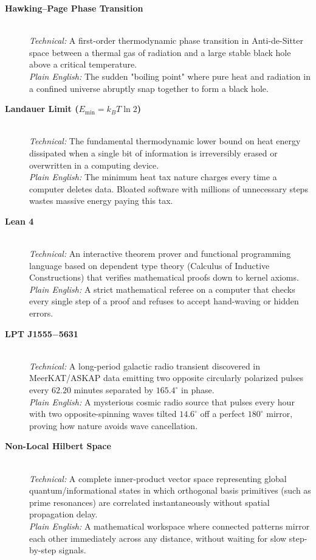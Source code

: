 \documentclass[11pt,a4paper,oneside]{article}
\def\texttt#1{#1}%
\theoremstyle{definition}
\begin{document}
\begin{description}
    \item[\textbf{Hawking–Page Phase Transition}] \hfill \\
    \textit{Technical:} A first-order thermodynamic phase transition in Anti-de-Sitter space between a thermal gas of radiation and a large stable black hole above a critical temperature. \\
    \textit{Plain English:} The sudden "boiling point" where pure heat and radiation in a confined universe abruptly snap together to form a black hole.

    \item[\textbf{Landauer Limit ($E_{\min} = k_B T \ln 2$)}] \hfill \\
    \textit{Technical:} The fundamental thermodynamic lower bound on heat energy dissipated when a single bit of information is irreversibly erased or overwritten in a computing device. \\
    \textit{Plain English:} The minimum heat tax nature charges every time a computer deletes data. Bloated software with millions of unnecessary steps wastes massive energy paying this tax.

    \item[\textbf{Lean 4}] \hfill \\
    \textit{Technical:} An interactive theorem prover and functional programming language based on dependent type theory (Calculus of Inductive Constructions) that verifies mathematical proofs down to kernel axioms. \\
    \textit{Plain English:} A strict mathematical referee on a computer that checks every single step of a proof and refuses to accept hand-waving or hidden errors.

    \item[\textbf{\texttt{LPT J1555$-$5631}}] \hfill \\
    \textit{Technical:} A long-period galactic radio transient discovered in MeerKAT/ASKAP data emitting two opposite circularly polarized pulses every $62.20$ minutes separated by $165.4^\circ$ in phase. \\
    \textit{Plain English:} A mysterious cosmic radio source that pulses every hour with two opposite-spinning waves tilted $14.6^\circ$ off a perfect $180^\circ$ mirror, proving how nature avoids wave cancellation.

    \item[\textbf{Non-Local Hilbert Space}] \hfill \\
    \textit{Technical:} A complete inner-product vector space representing global quantum/informational states in which orthogonal basis primitives (such as prime resonances) are correlated instantaneously without spatial propagation delay. \\
    \textit{Plain English:} A mathematical workspace where connected patterns mirror each other immediately across any distance, without waiting for slow step-by-step signals.


\end{description}
\end{document}
